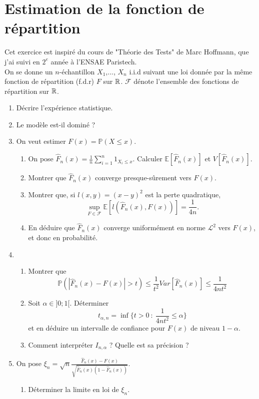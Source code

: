 \section{Estimation de la fonction de répartition}

Cet exercice est inspiré du cours de "Théorie des Tests" de Marc Hoffmann, que j'ai suivi en $2^e$ année à l'ENSAE Paristech.\\

On se donne un $n$-échantillon $X_1$,..., $X_n$ i.i.d suivant une loi donnée par la même fonction de répartition (f.d.r) $F$ sur $\mathbb R$. $\mathcal F$ dénote l'ensemble des fonctions de répartition sur $\mathbb R$.

\begin{enumerate}
\item Décrire l'expérience statistique.
\item Le modèle est-il dominé ?
\item On veut estimer $F(x)=\mathbb P(X\leq x)$.
	\begin{enumerate}
	\item On pose $\hat F_n(x)=\frac{1}{n}\sum_{i=1}^n 1_{X_i\leq x}$. Calculer $\mathbb E[\hat F_n(x)]$ et $V[\hat F_n(x)]$.
	\item Montrer que $\hat F_n(x)$ converge presque-sûrement vers $F(x)$.
	\item Montrer que, si $l(x,y)=(x-y)^2$ est la perte quadratique, \[\sup_{F\in \mathcal F} \mathbb E[l(\hat F_n(x),F(x))]=\frac{1}{4n}.\]
	\item En déduire que $\hat F_n(x)$ converge uniformément en norme $\mathcal L^2$ vers $F(x)$, et donc en probabilité.
	\end{enumerate}
\item \begin{enumerate}
	\item Montrer que \[\mathbb P(|\hat F_n(x) - F(x)|>t)\leq \frac{1}{t^2}Var[\hat F_n (x)]\leq \frac{1}{4nt^2}\]
	\item Soit $\alpha\in ]0;1[$. Déterminer 
	\[t_{\alpha,n}=\inf \{t>0 \ : \ \frac{1}{4nt^2}\leq \alpha\}\]
	et en déduire un intervalle de confiance pour $F(x)$ de niveau $1-\alpha$.
	\item Comment interpréter $I_{n,\alpha}$ ? Quelle est sa précision ?
	\end{enumerate}
\item On pose $\xi_n = \sqrt{n}\frac{\hat F_n(x) - F(x)}{\sqrt{\hat F_n(x)(1-\hat F_n(x))}}$.
	\begin{enumerate}
	\item Déterminer la limite en loi de $\xi_n$.

\end{enumerate}
\end{enumerate}
